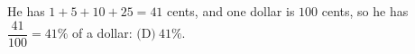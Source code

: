 He has $1+5+10+25=41$ cents, and one dollar is $100$ cents, so he has $\dfrac{41}{100}=41\%$ of a dollar: $\boxed{\text{(D)}\ 41\%}$.
